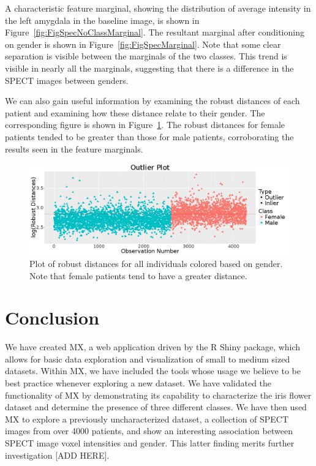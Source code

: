 \documentclass[review]{siamart0516}
\begin{document}
A characteristic feature marginal, showing the distribution of average intensity in the left amygdala in the baseline image, is shown in Figure~\ref{fig:FigSpecNoClassMarginal}. The resultant marginal after conditioning on gender is shown in Figure~\ref{fig:FigSpecMarginal}. Note that some clear separation is visible between the marginals of the two classes. This trend is visible in nearly all the marginals, suggesting that there is a difference in the SPECT images between genders.

We can also gain useful information by examining the robust distances of each patient and examining how these distance relate to their gender. The corresponding figure is shown in Figure~\ref{fig:FigSpecOutlierPlot}. The robust distances for female patients tended to be greater than those for male patients, corroborating the results seen in the feature marginals.

\begin{figure}[t]
	\centering
	\includegraphics[width=\textwidth,valign=t]{Figures/Spect_Gender/OutlierPlot.png}
	\caption{Plot of robust distances for all individuals colored based on gender. Note that female patients tend to have a greater distance.}
	\label{fig:FigSpecOutlierPlot}
	\hfill
\end{figure}

\section{Conclusion}
\label{sec:conc}

We have created MX, a web application driven by the R Shiny package, which allows for basic data exploration and visualization of small to medium sized datasets. Within MX, we have included the tools whose usage we believe to be best practice whenever exploring a new dataset. We have validated the functionality of MX by demonstrating its capability to characterize the iris flower dataset and determine the presence of three different classes. We have then used MX to explore a previously uncharacterized dataset, a collection of SPECT images from over 4000 patients, and show an interesting association between SPECT image voxel intensities and gender. This latter finding merits further investigation [ADD HERE].
\end{document}
